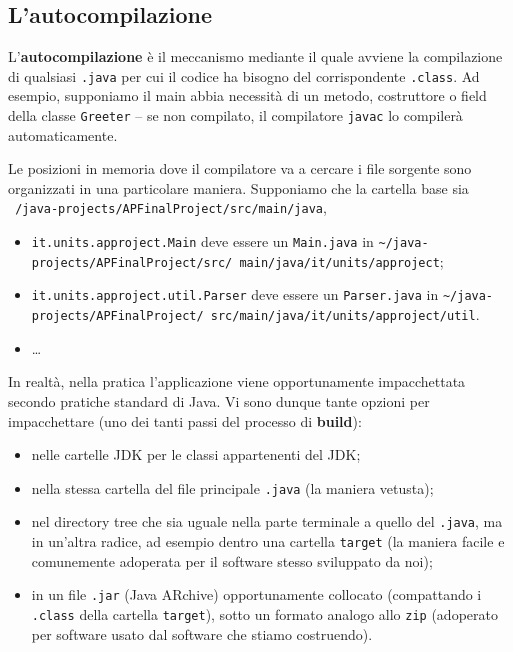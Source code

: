\documentclass[\fontsizeclass,twocolumn]{\classname}
\theoremstyle{definition}
\theoremstyle{definition}
\begin{document}
\subsection{L'autocompilazione}

L'\textbf{autocompilazione} è il meccanismo mediante il quale avviene la
compilazione di qualsiasi \texttt{.java} per cui il codice ha bisogno del
corrispondente \texttt{.class}. Ad esempio, supponiamo il main abbia necessità
di un metodo, costruttore o field della classe \texttt{Greeter} -- se non
compilato, il compilatore \texttt{javac} lo compilerà automaticamente.

Le posizioni in memoria dove il compilatore va a cercare i file sorgente sono
organizzati in una particolare maniera. Supponiamo che la cartella base sia
\texttt{~/java-projects/APFinalProject/src/main/java},
\begin{itemize}
    \item \texttt{it.units.approject.Main} deve essere un \texttt{Main.java} in
        \texttt{\textasciitilde/java-projects/APFinalProject/src/
        main/java/it/units/approject};
    \item \texttt{it.units.approject.util.Parser} deve essere un
        \texttt{Parser.java} in
        \texttt{\textasciitilde/java-projects/APFinalProject/
        src/main/java/it/units/approject/util}.
    \item \dots
\end{itemize}

In realtà, nella pratica l'applicazione viene opportunamente impacchettata
secondo pratiche standard di Java. Vi sono dunque tante opzioni per
impacchettare (uno dei tanti passi del processo di \textbf{build}):
\begin{itemize}
    \item nelle cartelle JDK per le classi appartenenti del JDK;
    \item nella stessa cartella del file principale \texttt{.java} (la maniera
        vetusta);
    \item nel directory tree che sia uguale nella parte terminale a quello del
        \texttt{.java}, ma in un'altra radice, ad esempio dentro una cartella
        \texttt{target} (la maniera facile e comunemente adoperata per il
        software stesso sviluppato da noi);
    \item in un file \texttt{.jar} (Java ARchive) opportunamente collocato
        (compattando i \texttt{.class} della cartella \texttt{target}), sotto
        un formato analogo allo \texttt{zip} (adoperato per software usato dal
        software che stiamo costruendo).
\end{itemize}
\end{document}
